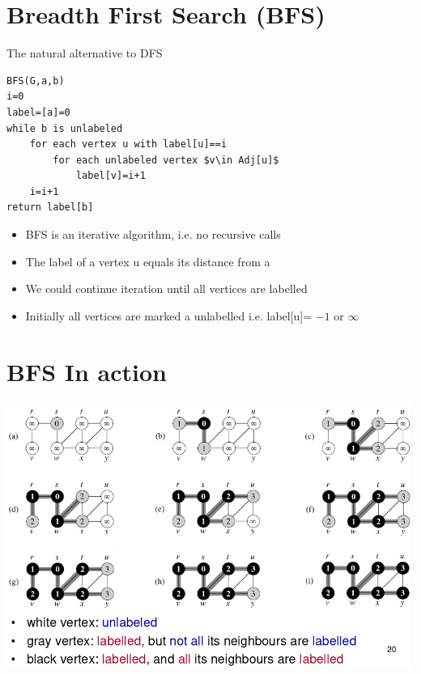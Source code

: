 \documentclass{article}[18pt]
\begin{document}
\section{Breadth First Search (BFS)}
The natural alternative to DFS
\begin{lstlisting}
BFS(G,a,b)
i=0
label=[a]=0
while b is unlabeled
	for each vertex u with label[u]==i
		for each unlabeled vertex $v\in Adj[u]$
			label[v]=i+1
	i=i+1
return label[b]
\end{lstlisting}
\begin{itemize}
	\item BFS is an iterative algorithm, i.e. no recursive calls
	\item The label of a vertex u equals its distance from a
	\item We could continue iteration until all vertices are labelled
	\item Initially all vertices are marked a unlabelled i.e. label[u]= $-1$ or $\infty$
\end{itemize}
\section{BFS In action}
\begin{center}
	\includegraphics[scale=0.7]{BFS}
\end{center}
\end{document}
